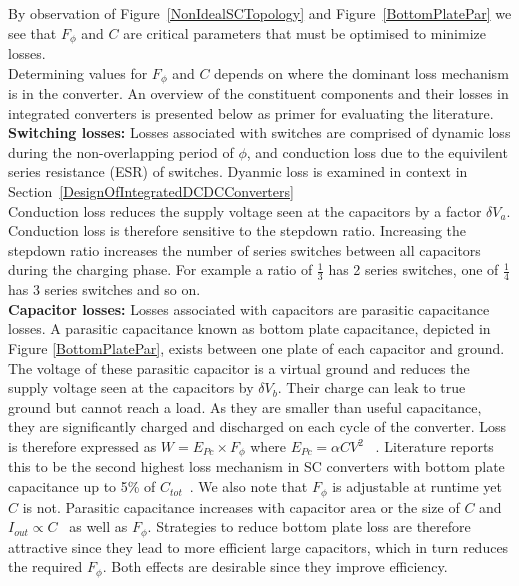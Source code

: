 \documentclass[letterpaper,twocolumn,10pt]{article}
\begin{document}
By observation of Figure~\ref{NonIdealSCTopology} and Figure~\ref{BottomPlatePar} we see that $F_\phi$ and $C$ are critical parameters that must be optimised to minimize losses.\\
Determining values for $F_\phi$ and $C$ depends on where the dominant loss mechanism is in the converter. An overview of the constituent components and their losses in integrated converters is presented below as primer for evaluating the literature.\\ 
\textbf{Switching losses: }Losses associated with switches are comprised of dynamic loss during the non-overlapping period of $\phi$, and conduction loss due to the equivilent series resistance (ESR) of switches. Dyanmic loss is examined in context in Section~\ref{DesignOfIntegratedDCDCConverters}\\
Conduction loss reduces the supply voltage seen at the capacitors by a factor $\delta V_a$. Conduction loss is therefore sensitive to the stepdown ratio. Increasing the stepdown ratio increases the number of series switches between all capacitors during the charging phase. For example a ratio of $\frac{1}{3}$ has 2 series switches, one of $\frac{1}{4}$ has 3 series switches and so on.\\
\textbf{Capacitor losses: }Losses associated with capacitors are parasitic capacitance losses. A parasitic capacitance known as bottom plate capacitance, depicted in Figure \ref{BottomPlatePar}, exists between one plate of each capacitor and ground. The voltage of these parasitic capacitor is a virtual ground and reduces the supply voltage seen at the capacitors by $\delta V_b$. Their charge can leak to true ground but cannot reach a load. As they are smaller than useful capacitance, they are significantly charged and discharged on each cycle of the converter. Loss is therefore expressed as $W = E_{Pc} \times F_\phi$ where $E_{Pc} = \alpha CV^2$ ~\cite{Damak2013}. Literature reports this to be the second highest loss mechanism in SC converters with bottom plate capacitance up to 5\% of $C_{tot}$~\cite{Ramadass2007}. We also note that $F_\phi$ is adjustable at runtime yet $C$ is not. Parasitic capacitance increases with capacitor area or the size of $C$ and $I_{out} \propto C$~\cite{Damak2013} as well as $F_\phi$. Strategies to reduce bottom plate loss are therefore attractive since they lead to more efficient large capacitors, which in turn reduces the required $F_\phi$. Both effects are desirable since they improve efficiency.\\
\end{document}
